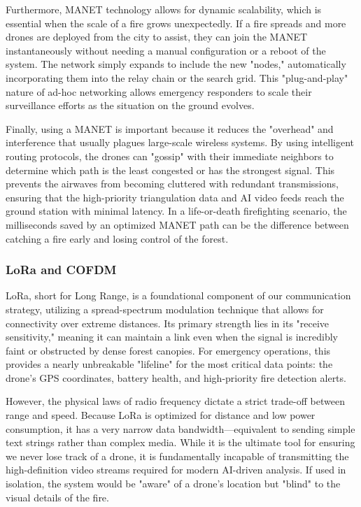 \documentclass[journal, onecolumn]{IEEEtran}
\begin{document}
Furthermore, MANET technology allows for dynamic scalability, which is essential when the scale of a fire grows unexpectedly. If a fire spreads and more drones are deployed from the city to assist, they can join the MANET instantaneously without needing a manual configuration or a reboot of the system. The network simply expands to include the new "nodes," automatically incorporating them into the relay chain or the search grid. This "plug-and-play" nature of ad-hoc networking allows emergency responders to scale their surveillance efforts as the situation on the ground evolves.

Finally, using a MANET is important because it reduces the "overhead" and interference that usually plagues large-scale wireless systems. By using intelligent routing protocols, the drones can "gossip" with their immediate neighbors to determine which path is the least congested or has the strongest signal. This prevents the airwaves from becoming cluttered with redundant transmissions, ensuring that the high-priority triangulation data and AI video feeds reach the ground station with minimal latency. In a life-or-death firefighting scenario, the milliseconds saved by an optimized MANET path can be the difference between catching a fire early and losing control of the forest.

\subsubsection{LoRa and COFDM}

LoRa, short for Long Range, is a foundational component of our communication strategy, utilizing a spread-spectrum modulation technique that allows for connectivity over extreme distances. Its primary strength lies in its "receive sensitivity," meaning it can maintain a link even when the signal is incredibly faint or obstructed by dense forest canopies. For emergency operations, this provides a nearly unbreakable "lifeline" for the most critical data points: the drone’s GPS coordinates, battery health, and high-priority fire detection alerts.

However, the physical laws of radio frequency dictate a strict trade-off between range and speed. Because LoRa is optimized for distance and low power consumption, it has a very narrow data bandwidth—equivalent to sending simple text strings rather than complex media. While it is the ultimate tool for ensuring we never lose track of a drone, it is fundamentally incapable of transmitting the high-definition video streams required for modern AI-driven analysis. If used in isolation, the system would be "aware" of a drone's location but "blind" to the visual details of the fire.
\end{document}
